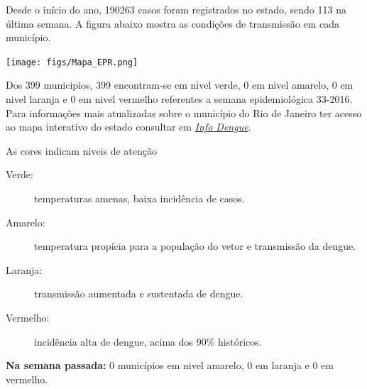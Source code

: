 \documentclass[10pt]{article} %
\begin{document}
\begin{minipage}[t]{.66\linewidth} %

\hypertarget{estado}{} %

Desde o início do ano, 190263 casos foram registrados no estado, sendo 113 na última semana. A figura abaixo mostra as condições de transmissão em cada município.

\texttt{[image: figs/Mapa\_EPR.png]}

Dos 399 municipios, 399 encontram-se em nivel verde, 0 em nivel amarelo, 0 em nivel laranja e 0 em nivel vermelho referentes a semana epidemiológica 33-2016. Para informações mais atualizadas
sobre o município do Rio de Janeiro ter acesso ao mapa interativo do estado consultar em \href{http://info.dengue.mat.br}{\textit{Info Dengue}}.


\vspace{1cm}
\begin{mdframed}[style=intextbox,frametitle={}] %

\hypertarget{descriptivebox}{} %
As cores indicam niveis de atenção
\begin{description}
\item[Verde:] temperaturas amenas, baixa incidência de casos.      
\item[Amarelo:] temperatura propícia para a população do vetor e transmissão da dengue.
\item[Laranja:] transmissão aumentada e sustentada de dengue. 
\item[Vermelho:] incidência alta de dengue, acima dos 90\% históricos.
\end{description}
\end{mdframed}

 \textbf{Na semana passada:} 0 municípios em nivel amarelo, 0 em laranja e 0 em vermelho.    

\end{minipage} %
\end{document}
